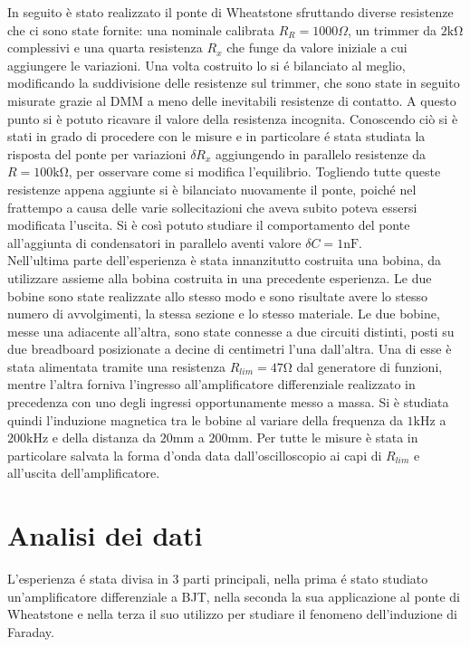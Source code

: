 \documentclass{article}
\begin{document}
In seguito è stato realizzato il ponte di Wheatstone sfruttando diverse resistenze che ci sono state fornite: una nominale calibrata $R_R = 1000 \Omega$, un trimmer da $2 \si{\kilo\ohm}$ complessivi e una quarta resistenza $R_x$ che funge da valore iniziale a cui aggiungere le variazioni. Una volta costruito lo si \'e bilanciato al meglio, modificando la suddivisione delle resistenze sul trimmer, che sono state in seguito misurate grazie al DMM a meno delle inevitabili resistenze di contatto. A questo punto si è potuto ricavare il valore della resistenza incognita. Conoscendo ciò si è stati in grado di procedere con le misure e in particolare \'e stata studiata la risposta del ponte per variazioni $\delta R_x$ aggiungendo in parallelo resistenze da $R = 100 \si{\kilo\ohm}$, per osservare come si modifica l'equilibrio. Togliendo tutte queste resistenze appena aggiunte si è bilanciato nuovamente il ponte, poiché nel frattempo a causa delle varie sollecitazioni che aveva subito poteva essersi modificata l'uscita. Si è così potuto studiare il comportamento del ponte all'aggiunta di condensatori in parallelo aventi valore $\delta C = 1 \si{\nano\farad}$.\\

Nell'ultima parte dell'esperienza è stata innanzitutto costruita una bobina, da utilizzare assieme alla bobina costruita in una precedente esperienza. Le due bobine sono state realizzate allo stesso modo e sono risultate avere lo stesso numero di avvolgimenti, la stessa sezione e lo stesso materiale. Le due bobine, messe una adiacente all'altra, sono state connesse a due circuiti distinti, posti su due breadboard posizionate a decine di centimetri l'una dall'altra. Una di esse è stata alimentata tramite una resistenza $R_{lim}=47 \si{\ohm}$ dal generatore di funzioni, mentre l'altra forniva l'ingresso all'amplificatore differenziale realizzato in precedenza con uno degli ingressi opportunamente messo a massa. Si è studiata quindi l'induzione magnetica tra le bobine al variare della frequenza da $1\si{\kilo\hertz}$ a $200\si{\kilo\hertz}$ e della distanza da $20 \si{\milli\meter}$ a $200 \si{\milli\meter}$. Per tutte le misure è stata in particolare salvata la forma d'onda data dall'oscilloscopio ai capi di $R_{lim}$ e all'uscita dell'amplificatore.

\newpage
\section{Analisi dei dati}
L'esperienza \'e stata divisa in 3 parti principali, nella prima \'e stato studiato un'amplificatore differenziale a BJT, nella seconda la sua applicazione al ponte di Wheatstone e nella terza il suo utilizzo per studiare il fenomeno dell'induzione di Faraday.
\end{document}
